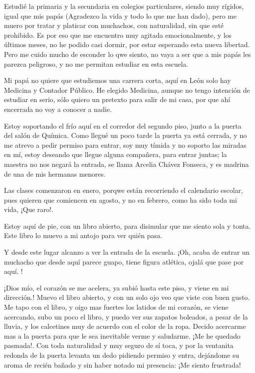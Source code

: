 \documentclass[letterpaper, 12pt]{book}
\begin{document}
Estudié la primaria y la secundaria en colegios particulares, siendo muy rígidos, igual que mis papás (Agradezco la vida y todo lo que me han dado), pero me muero por tratar y platicar con muchachos, con naturalidad, sin que esté prohibido. Es por eso que me encuentro muy agitada emocionalmente, y los últimos meses, no he podido casi dormir, por estar esperando esta nueva libertad. Pero me cuido mucho de esconder lo qwe siento, no vaya a ser que a mis papás les parezca peligroso, y no me permitan estudiar en esta escuela.

Mi papá no quiere que estudiemos una carrera corta, aquí en León solo hay Medicina y Contador Público. He elegido Medicina, aunque no tengo intención de estudiar en serio, sólo quiero un pretexto para salir de mi casa, por que ahí encerrada no voy a conocer a nadie.

Estoy soportando el frío aquí en el corredor del segundo piso, junto a la puerta del salón de Química. Como llegué un poco tarde la puerta ya está cerrada, y no me atrevo a pedir permiso para entrar, soy muy tímida y no soporto las miradas en mí, estoy deseando que llegue alguna compañera, para entrar juntas; la maestra no nos negará la entrada, se llama Arcelia Chávez Fonseca, y es madrina de una de mis hermanas menores.

Las clases comenzaron en enero, porqwe están recorriendo el calendario escolar, pues quieren que comiencen en agosto, y no en febrero, como ha sido toda mi vida, ¡Que raro!.

Estoy aquí de pie, con un libro abierto, para disimular que me siento sola y tonta. Este libro lo muevo a mi antojo para ver quién pasa.
 
Y desde este lugar alcanzo a ver la entrada de la escuela. ¡Oh, acaba de entrar un muchacho que desde aquí parece guapo, tiene figura atlética, ojalá que pase por aquí. !

¡Dios mío, el corazón se me acelera, ya subió hasta este piso, y viene en mi dirección.! Muevo el libro abierto, y con un solo ojo veo que viste con buen gusto. Me tapo con el libro, y oigo mas fuertes los latidos de mi corazón, se viene acercando, subo un poco el libro, y puedo ver sus zapatos boleados, a pesar de la lluvia, y los calcetines muy de acuerdo con el color de la ropa. Decido acercarme mas a la puerta para que le sea inevitable verme y saludarme. ¡Me he quedado pasmada!. Con toda naturalidad y muy seguro de sí toca, y por la ventanita redonda de la puerta levanta un dedo pidiendo permiso y entra, dejándome su aroma de recién bañado y sin haber notado mi presencia: ¡Me siento frustrada!
\end{document}
